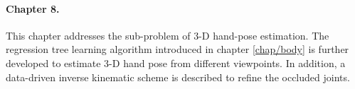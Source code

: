 \paragraph{Chapter 8.} 
This chapter addresses the sub-problem of 3-D hand-pose estimation. 
The regression tree learning algorithm introduced in chapter \ref{chap/body} is further developed to estimate 3-D hand pose from different viewpoints. 
In addition, a data-driven inverse kinematic scheme is described to refine the occluded joints.

